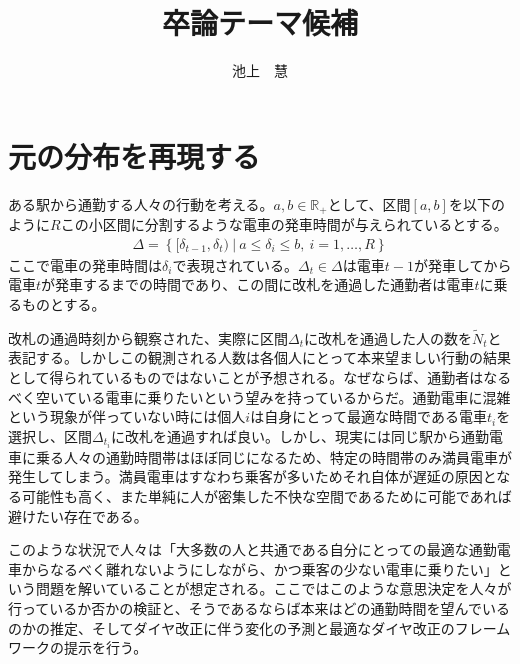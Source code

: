 \documentclass{jsarticle}
\begin{document}
\title{卒論テーマ候補 }
\author{池上　慧}
\maketitle

\section{元の分布を再現する}
ある駅から通勤する人々の行動を考える。$a,b\in \mathbb{R}_{+}$として、区間$[a, b]$を以下のように$R$この小区間に分割するような電車の発車時間が与えられているとする。
\begin{align*}
	\Delta = \left\{ [\delta_{t-1}, \delta_t)\ |\ a \leq \delta_i \leq b,\ i = 1, \dots, R \right\}
\end{align*}
ここで電車の発車時間は$\delta_i$で表現されている。$\Delta_t \in \Delta$は電車$t-1$が発車してから電車$t$が発車するまでの時間であり、この間に改札を通過した通勤者は電車$t$に乗るものとする。

改札の通過時刻から観察された、実際に区間$\Delta_t$に改札を通過した人の数を$\tilde{N}_t$と表記する。しかしこの観測される人数は各個人にとって本来望ましい行動の結果として得られているものではないことが予想される。なぜならば、通勤者はなるべく空いている電車に乗りたいという望みを持っているからだ。通勤電車に混雑という現象が伴っていない時には個人$i$は自身にとって最適な時間である電車$t_i$を選択し、区間$\Delta_{t_i}$に改札を通過すれば良い。しかし、現実には同じ駅から通勤電車に乗る人々の通勤時間帯はほぼ同じになるため、特定の時間帯のみ満員電車が発生してしまう。満員電車はすなわち乗客が多いためそれ自体が遅延の原因となる可能性も高く、また単純に人が密集した不快な空間であるために可能であれば避けたい存在である。

このような状況で人々は「大多数の人と共通である自分にとっての最適な通勤電車からなるべく離れないようにしながら、かつ乗客の少ない電車に乗りたい」という問題を解いていることが想定される。ここではこのような意思決定を人々が行っているか否かの検証と、そうであるならば本来はどの通勤時間を望んでいるのかの推定、そしてダイヤ改正に伴う変化の予測と最適なダイヤ改正のフレームワークの提示を行う。
\end{document}
